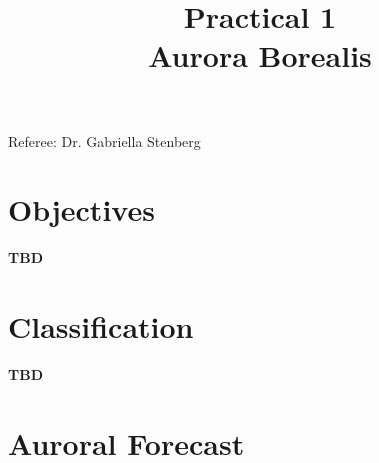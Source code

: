 \documentclass{article}
\title{Practical 1\\ Aurora Borealis} %
\author{\authors}
\begin{document}
\maketitle %

\centerline{Referee: Dr. Gabriella Stenberg}

\setlength\parindent{0pt} %

\renewcommand{\labelenumi}{\alph{enumi}.} %


\section{Objectives}

\textbf{TBD}

 

\section{Classification}

\textbf{TBD}


\section{Auroral Forecast}
\end{document}
